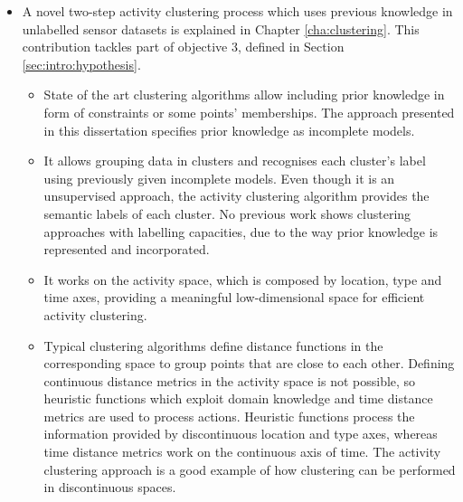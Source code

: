 \begin{itemize}
 \item A novel two-step activity clustering process which uses previous knowledge in unlabelled sensor datasets is explained in Chapter \ref{cha:clustering}. This contribution tackles part of objective 3, defined in Section \ref{sec:intro:hypothesis}. %
 \begin{itemize}
  \item State of the art clustering algorithms allow including prior knowledge in form of constraints or some points' memberships. The approach presented in this dissertation specifies prior knowledge as incomplete models.
  \item It allows grouping data in clusters and recognises each cluster's label using previously given incomplete models. Even though it is an unsupervised approach, the activity clustering algorithm provides the semantic labels of each cluster. No previous work shows clustering approaches with labelling capacities, due to the way prior knowledge is represented and incorporated.
  \item It works on the activity space, which is composed by location, type and time axes, providing a meaningful low-dimensional space for efficient activity clustering.
  \item Typical clustering algorithms define distance functions in the corresponding space to group points that are close to each other. Defining continuous distance metrics in the activity space is not possible, so heuristic functions which exploit domain knowledge and time distance metrics are used to process actions. Heuristic functions process the information provided by discontinuous location and type axes, whereas time distance metrics work on the continuous axis of time. The activity clustering approach is a good example of how clustering can be performed in discontinuous spaces.
 \end{itemize}


\end{itemize}
